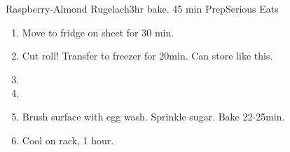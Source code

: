 \documentclass[]{mikescards}
\begin{document}
\begin{recipe}{Raspberry-Almond Rugelach}{3hr bake. 45 min Prep}{Serious Eats}
\begin{parcolumns}[colwidths={1=100pt}, rulebetween]{2}
{\begin{enumerate}
      \item Move to fridge on sheet for 30 min.
      \item Cut roll! Transfer to freezer for 20min. Can store like this.
      \item 
      \item
      \item Brush surface with egg wash. Sprinkle sugar. Bake 22-25min. 
      \item Cool on rack, 1 hour. 
    \end{enumerate}
  }
\end{parcolumns}



\end{recipe}
\end{document}
